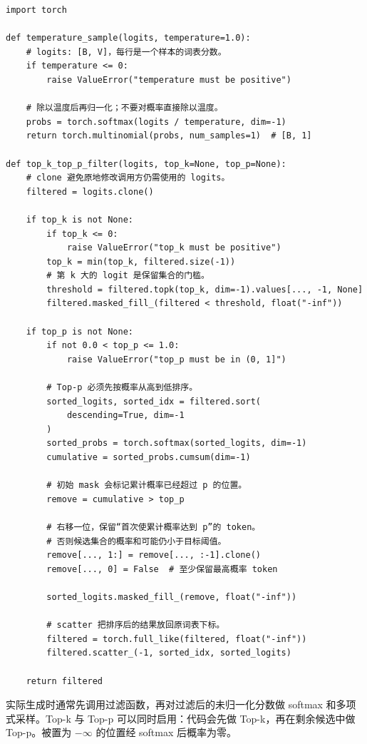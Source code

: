 
\begin{lstlisting}
import torch

def temperature_sample(logits, temperature=1.0):
    # logits: [B, V]，每行是一个样本的词表分数。
    if temperature <= 0:
        raise ValueError("temperature must be positive")

    # 除以温度后再归一化；不要对概率直接除以温度。
    probs = torch.softmax(logits / temperature, dim=-1)
    return torch.multinomial(probs, num_samples=1)  # [B, 1]

def top_k_top_p_filter(logits, top_k=None, top_p=None):
    # clone 避免原地修改调用方仍需使用的 logits。
    filtered = logits.clone()

    if top_k is not None:
        if top_k <= 0:
            raise ValueError("top_k must be positive")
        top_k = min(top_k, filtered.size(-1))
        # 第 k 大的 logit 是保留集合的门槛。
        threshold = filtered.topk(top_k, dim=-1).values[..., -1, None]
        filtered.masked_fill_(filtered < threshold, float("-inf"))

    if top_p is not None:
        if not 0.0 < top_p <= 1.0:
            raise ValueError("top_p must be in (0, 1]")

        # Top-p 必须先按概率从高到低排序。
        sorted_logits, sorted_idx = filtered.sort(
            descending=True, dim=-1
        )
        sorted_probs = torch.softmax(sorted_logits, dim=-1)
        cumulative = sorted_probs.cumsum(dim=-1)

        # 初始 mask 会标记累计概率已经超过 p 的位置。
        remove = cumulative > top_p

        # 右移一位，保留“首次使累计概率达到 p”的 token。
        # 否则候选集合的概率和可能仍小于目标阈值。
        remove[..., 1:] = remove[..., :-1].clone()
        remove[..., 0] = False  # 至少保留最高概率 token

        sorted_logits.masked_fill_(remove, float("-inf"))

        # scatter 把排序后的结果放回原词表下标。
        filtered = torch.full_like(filtered, float("-inf"))
        filtered.scatter_(-1, sorted_idx, sorted_logits)

    return filtered
\end{lstlisting}

实际生成时通常先调用过滤函数，再对过滤后的未归一化分数做 softmax 和多项式采样。Top-k 与 Top-p 可以同时启用：代码会先做 Top-k，再在剩余候选中做 Top-p。被置为 $-\infty$ 的位置经 softmax 后概率为零。

